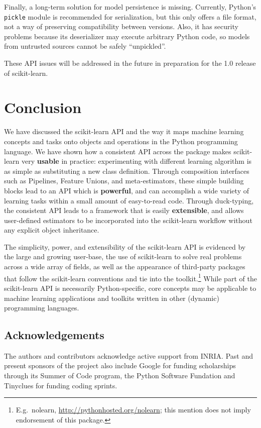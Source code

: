 \documentclass{llncs}
\DeclareRobustCommand{\VAN}[3]{#2}
\begin{document}
Finally, a long-term solution for model persistence is missing.
Currently, Python's \texttt{pickle} module is recommended for serialization,
but this only offers a file format,
not a way of preserving compatibility between versions.
Also, it has security problems because its deserializer
may execute arbitrary Python code,
so models from untrusted sources cannot be safely ``unpickled''.

These API issues will be addressed in the future in preparation for
the 1.0 release of scikit-learn.


\section{Conclusion}
\label{sec:conclusions}

We have discussed the scikit-learn API
and the way it maps machine learning concepts and tasks
onto objects and operations in the Python programming language.
We have shown how a consistent API across the package makes scikit-learn
very \textbf{usable} in practice: experimenting with different learning
algorithm is as simple as substituting a new class definition.
Through composition interfaces such as Pipelines, Feature Unions,
and meta-estimators, these simple building blocks lead to an API which is
\textbf{powerful}, and can accomplish a wide variety of learning tasks
within a small amount of easy-to-read code.
Through duck-typing, the consistent API leads to a framework that is
easily \textbf{extensible}, and allows user-defined estimators to be
incorporated into the scikit-learn workflow without any explicit object
inheritance.

The simplicity, power, and extensibility of the scikit-learn API is evidenced
by the large and growing user-base, the use of scikit-learn to solve real
problems across a wide array of fields,
as well as the appearance of third-party packages
that follow the scikit-learn conventions and tie into the toolkit.\footnote{
  E.g.\ nolearn, \url{http://pythonhosted.org/nolearn};
  this mention does not imply endorsement of this package.}
While part of the scikit-learn API is necessarily Python-specific,
core concepts may be applicable to
machine learning applications and toolkits
written in other (dynamic) programming languages.

\subsection*{Acknowledgements}

The authors and contributors acknowledge active support from INRIA. Past and
present sponsors of the project also include Google for funding
scholarships through its Summer of Code program,
the Python Software Fundation and Tinyclues for funding coding sprints.


\DeclareRobustCommand{\VAN}[3]{#3}

\end{document}
